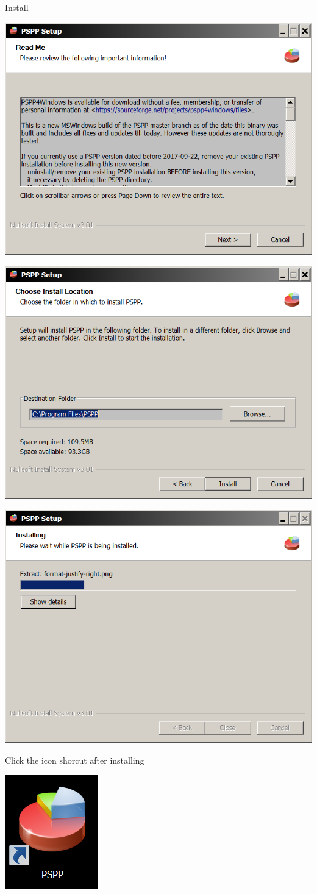 \documentclass[
]{book}
\begin{document}
Install

\includegraphics[width=0.65\linewidth]{images/psppinstall}

\includegraphics[width=0.65\linewidth]{images/psppinstall2}

\includegraphics[width=0.65\linewidth]{images/psppinstall3}

Click the icon shorcut after installing

\includegraphics[width=0.25\linewidth]{images/psppicon}
\end{document}
